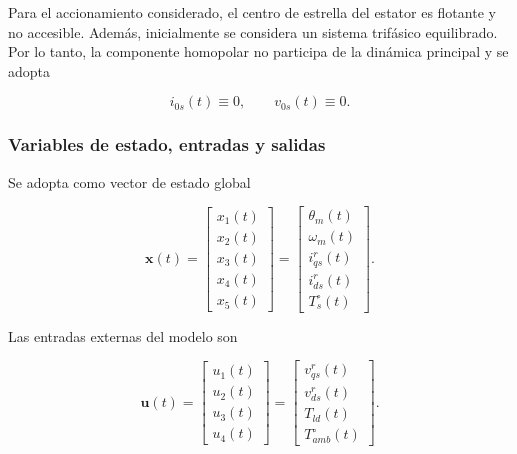\documentclass[10pt,a4paper]{article}
\begin{document}
Para el accionamiento considerado, el centro de estrella del estator es flotante y no accesible. Además, inicialmente se considera un sistema trifásico equilibrado. Por lo tanto, la componente homopolar no participa de la dinámica principal y se adopta

\begin{equation}
    i_{0s}(t) \equiv 0,
    \qquad
    v_{0s}(t) \equiv 0.
    \label{eq:homopolar_nula}
\end{equation}

\subsubsection{Variables de estado, entradas y salidas}

Se adopta como vector de estado global

\begin{equation}
    \mathbf{x}(t)=
    \begin{bmatrix}
        x_1(t)\\ x_2(t)\\ x_3(t)\\ x_4(t)\\ x_5(t)
    \end{bmatrix}
    =
    \begin{bmatrix}
        \theta_m(t)\\
        \omega_m(t)\\
        i_{qs}^{r}(t)\\
        i_{ds}^{r}(t)\\
        T_s^{\circ}(t)
    \end{bmatrix}.
    \label{eq:vector_estado_global_nl}
\end{equation}

Las entradas externas del modelo son

\begin{equation}
    \mathbf{u}(t)=
    \begin{bmatrix}
        u_1(t)\\ u_2(t)\\ u_3(t)\\ u_4(t)
    \end{bmatrix}
    =
    \begin{bmatrix}
        v_{qs}^{r}(t)\\
        v_{ds}^{r}(t)\\
        T_{ld}(t)\\
        T_{amb}^{\circ}(t)
    \end{bmatrix}.
    \label{eq:vector_entrada_global_nl}
\end{equation}
\end{document}

